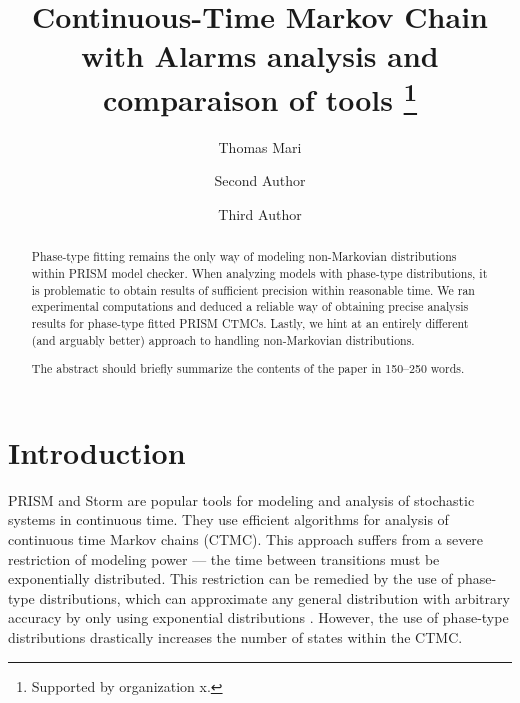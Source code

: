 \documentclass[runningheads,custombib]{llncs}
\begin{document}
%
\title{Continuous-Time Markov Chain with Alarms analysis and comparaison of tools \thanks{Supported by organization x.}}
%
%
\author{Thomas Mari \and
Second Author \and
Third Author}
%
%
%
\maketitle              %
%
\begin{abstract}
	Phase-type fitting remains the only way of modeling non-Markovian distributions within PRISM model checker.
	When analyzing models with phase-type distributions, it is problematic to obtain results of sufficient precision within reasonable time.
	We ran experimental computations and deduced a reliable way of obtaining precise analysis results for phase-type fitted PRISM CTMCs.
	Lastly, we hint at an entirely different (and arguably better) approach to handling non-Markovian distributions.

The abstract should briefly summarize the contents of the paper in
150--250 words.

\end{abstract}
%
%
%
\section{Introduction}

	PRISM \cite{KNP11} and Storm \cite{DBLP:journals/corr/DehnertJK017} are popular tools for modeling and analysis of stochastic systems in continuous time. They use efficient algorithms for analysis of continuous time Markov chains (CTMC). This approach suffers from a severe restriction of modeling power --- the time between transitions must be exponentially distributed. This restriction can be remedied by the use of phase-type distributions, which can approximate any general distribution with arbitrary accuracy by only using exponential distributions \cite{Buchholz:2014:IMP:2683922}. However, the use of phase-type distributions drastically increases the number of states within the CTMC.
	
\end{document}
